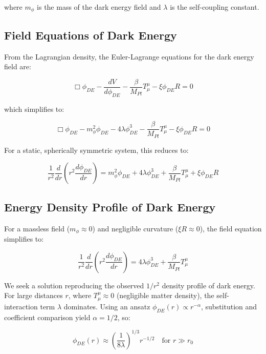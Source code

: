 \documentclass[a4paper,12pt]{article}
\theoremstyle{definition}
\theoremstyle{remark}
\begin{document}
	where $m_{\phi}$ is the mass of the dark energy field and $\lambda$ is the self-coupling constant.
	
	\subsection{Field Equations of Dark Energy}
	From the Lagrangian density, the Euler-Lagrange equations for the dark energy field are:
	
	\begin{equation}
		\Box\phi_{DE} - \frac{dV}{d\phi_{DE}} - \frac{\beta}{M_{Pl}}T^{\mu}_{\mu} - \xi \phi_{DE} R = 0
	\end{equation}
	
	which simplifies to:
	
	\begin{equation}
		\Box\phi_{DE} - m_{\phi}^2\phi_{DE} - 4\lambda\phi_{DE}^3 - \frac{\beta}{M_{Pl}}T^{\mu}_{\mu} - \xi \phi_{DE} R = 0
	\end{equation}
	
	For a static, spherically symmetric system, this reduces to:
	
	\begin{equation}
		\frac{1}{r^2}\frac{d}{dr}\left(r^2\frac{d\phi_{DE}}{dr}\right) = m_{\phi}^2\phi_{DE} + 4\lambda\phi_{DE}^3 + \frac{\beta}{M_{Pl}}T^{\mu}_{\mu} + \xi \phi_{DE} R
	\end{equation}
	
	\subsection{Energy Density Profile of Dark Energy}
	For a massless field ($m_{\phi} \approx 0$) and negligible curvature ($\xi R \approx 0$), the field equation simplifies to:
	
	\begin{equation}
		\frac{1}{r^2}\frac{d}{dr}\left(r^2\frac{d\phi_{DE}}{dr}\right) = 4\lambda\phi_{DE}^3 + \frac{\beta}{M_{Pl}}T^{\mu}_{\mu}
	\end{equation}
	
	We seek a solution reproducing the observed $1/r^2$ density profile of dark energy. For large distances $r$, where $T^{\mu}_{\mu} \approx 0$ (negligible matter density), the self-interaction term $\lambda$ dominates. Using an ansatz $\phi_{DE}(r) \propto r^{-\alpha}$, substitution and coefficient comparison yield $\alpha = 1/2$, so:
	
	\begin{equation}
		\phi_{DE}(r) \approx \left(\frac{1}{8\lambda}\right)^{1/3} r^{-1/2} \quad \text{for } r \gg r_0
	\end{equation}
	
\end{document}
